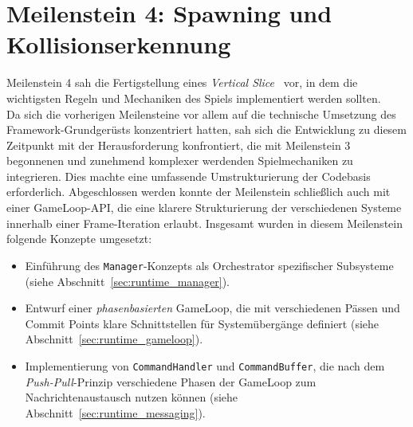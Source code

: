 \section{Meilenstein 4: Spawning und Kollisionserkennung}\label{sec:meilenstein_4}

Meilenstein 4 sah die Fertigstellung eines \textit{Vertical Slice}~\cite[S. 701]{Mcc04} vor, in dem die wichtigsten Regeln und Mechaniken des Spiels implementiert werden sollten.\\

Da sich die vorherigen Meilensteine vor allem auf die technische Umsetzung des Framework-Grundgerüsts konzentriert hatten, sah sich die Entwicklung zu diesem Zeitpunkt mit der Herausforderung konfrontiert, die mit Meilenstein 3 begonnenen und zunehmend komplexer werdenden Spielmechaniken zu integrieren.
Dies machte eine umfassende Umstrukturierung der Codebasis erforderlich.
Abgeschlossen werden konnte der Meilenstein schließlich auch mit einer GameLoop-API, die eine klarere Strukturierung der verschiedenen Systeme innerhalb einer Frame-Iteration erlaubt.
Insgesamt wurden in diesem Meilenstein folgende Konzepte umgesetzt:

\begin{itemize}
    \itemsep0.5em
    \item Einführung des \texttt{Manager}-Konzepts als Orchestrator spezifischer Subsysteme (siehe Abschnitt~\ref{sec:runtime_manager}).
    \item Entwurf einer \textit{phasenbasierten} GameLoop, die mit verschiedenen Pässen und Commit Points klare Schnittstellen für Systemübergänge definiert (siehe Abschnitt~\ref{sec:runtime_gameloop}).
    \item Implementierung von \texttt{CommandHandler} und \texttt{CommandBuffer}, die nach dem \textit{Push-Pull}-Prinzip verschiedene Phasen der GameLoop zum Nachrichtenaustausch nutzen können (siehe Abschnitt~\ref{sec:runtime_messaging}).
\end{itemize}

